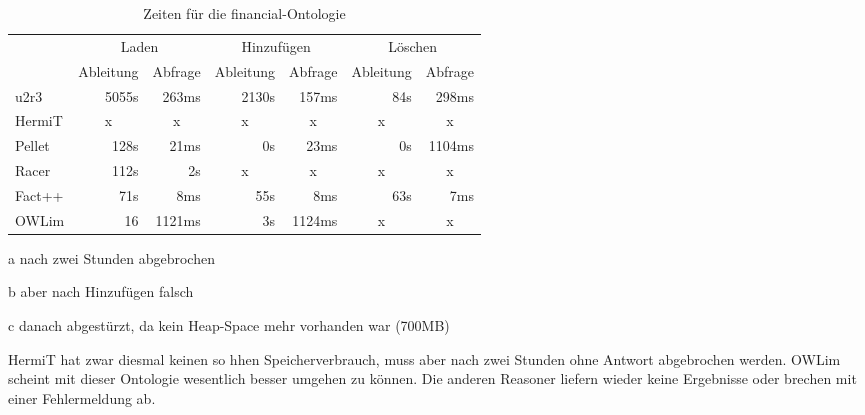 \begin{table}[htbp]
\caption{Zeiten für die financial-Ontologie}
\label{table-time-financial}
\begin{center}
\begin{threeparttable}
\begin{tabular}{l|r|r|r|r|r|r|}
\cline{2-7}
 & \multicolumn{2}{|c|}{Laden} & \multicolumn{2}{|c|}{Hinzufügen} & \multicolumn{2}{|c|}{Löschen} \\
\cline{2-7}
 & \multicolumn{1}{|c|}{Ableitung} & \multicolumn{1}{|c|}{Abfrage} & \multicolumn{1}{|c|}{Ableitung} & \multicolumn{1}{|c|}{Abfrage} & \multicolumn{1}{|c|}{Ableitung} & \multicolumn{1}{|c|}{Abfrage} \\
\hline
\multicolumn{1}{|l|}{u2r3} & 5055s & 263ms & 2130s & 157ms & 84s & 298ms \\ \hline
\multicolumn{1}{|l|}{HermiT\tnote{a}} & \multicolumn{1}{c|}{x} & \multicolumn{1}{c|}{x} & \multicolumn{1}{c|}{x} & \multicolumn{1}{c|}{x} & \multicolumn{1}{c|}{x} & \multicolumn{1}{c|}{x} \\ \hline
\multicolumn{1}{|l|}{Pellet\tnote{b}} & 128s & 21ms & 0s & 23ms & 0s & 1104ms \\ \hline
\multicolumn{1}{|l|}{Racer\tnote{c}} & 112s & 2s & \multicolumn{1}{c|}{x} & \multicolumn{1}{c|}{x} & \multicolumn{1}{c|}{x} & \multicolumn{1}{c|}{x} \\ \hline
\multicolumn{1}{|l|}{Fact++} & 71s & 8ms & 55s & 8ms & 63s & 7ms \\ \hline
\multicolumn{1}{|l|}{OWLim} & 16 & 1121ms & 3s & 1124ms & \multicolumn{1}{c|}{x} & \multicolumn{1}{c|}{x} \\ \hline
\end{tabular}
\begin{tablenotes}
	\item[a] nach zwei Stunden abgebrochen
	\item[b] aber nach Hinzufügen falsch
	\item[c] danach abgestürzt, da kein Heap-Space mehr vorhanden war (700MB)
\end{tablenotes}
\end{threeparttable}
\end{center}
\end{table}

HermiT hat zwar diesmal keinen so hhen Speicherverbrauch, muss aber nach zwei Stunden ohne Antwort abgebrochen werden. OWLim scheint mit dieser Ontologie wesentlich besser umgehen zu können. Die anderen Reasoner liefern wieder keine Ergebnisse oder brechen mit einer Fehlermeldung ab.

